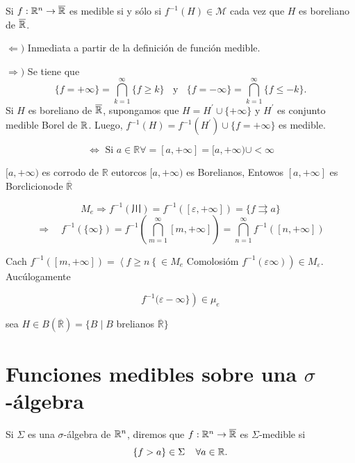 \begin{teorema}{}
Si $f:\mathbb{R}^n \to \overline{\mathbb{R}}$ es medible si y s\'olo si $f^{-1}(H) \in \mathscr{M}$ cada vez que $H$ es boreliano de $\overline{\mathbb{R}}$.
\end{teorema}

\begin{demo}
$\Leftarrow)$ Inmediata a partir de la definici\'on de funci\'on medible.

$\Rightarrow)$ Se tiene que 
\[
\{f=+\infty\}=\bigcap\limits_{k=1}^{\infty} \{f \geq k\}
\;\;\mbox{ y }\;\;
\{f=-\infty\}=\bigcap\limits_{k=1}^{\infty} \{f \leq -k\}.
\]
Si $H$ es boreliano de $\overline{\mathbb{R}}$, supongamos que $H=H^{'}\cup \{+\infty\}$ y $H^{'}$ es conjunto medible Borel de $\mathbb{R}$.
Luego, $f^{-1}(H)=f^{-1}(H^{'})\cup \{f=+\infty\}$ es medible.

$$
\Leftrightarrow \text { Si } a \in \mathbb{R} \forall=[a,+\infty]=[a,+\infty) \cup<\infty
$$

$[a,+\infty)$ es corrodo de $\mathbb{R}$ eutorcos $[a,+\infty)$ es Borelianos, Entowos $[a,+\infty]$ es Borclicionode $\overline{\mathbb{R}}$

$$
M_e \Rightarrow f^{-1}(川)=f^{-1}([\varepsilon,+\infty])=\{f \rightrightarrows a\}
$$
$$
\Rightarrow \quad f^{-1}(\{\infty\})=f^{-1}\left(\bigcap_{m=1}^{\infty}[m,+\infty]\right)=\bigcap_{n=1}^{\infty} f^{-1}([n,+\infty])
$$


Cach $f^{-1}([m,+\infty])=\left\langle f \geqslant n\left\{\in M_e\right.\right.$
Comolosióm $\left.f^{-1}(\varepsilon \infty)\right) \in M_{\varepsilon}$. Aucúlogamente

$$
\left.f^{-1}(\varepsilon-\infty\}\right) \in \mu_e
$$

sea $H \in B(\overline{\mathbb{R}})=\{B \mid B$ brelianos $\overline{\mathbb{R}}\}$

\end{demo}




\section{Funciones medibles sobre una $\sigma$-\'algebra}

\begin{definicion}{}
Si $\Sigma$ es una $\sigma$-\'algebra de $\mathbb{R}^n$, diremos que $f:\mathbb{R}^n\to \overline{\mathbb{R}}$ es $\Sigma$-medible si 
\[\{f>a\} \in \Sigma\;\;\;\;\forall a \in \mathbb{R}.\]
\end{definicion}

